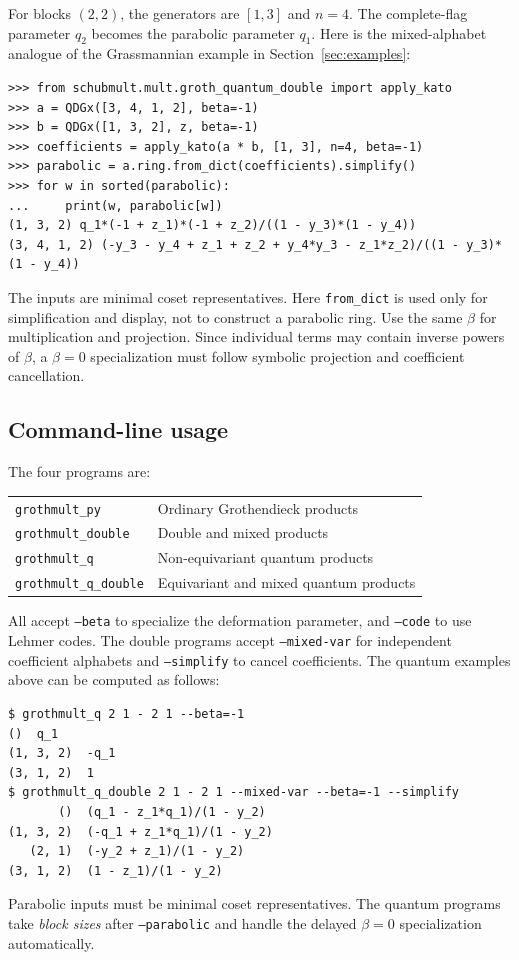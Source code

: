 \documentclass{amsart}
\theoremstyle{definition}
\theoremstyle{remark}
\numberwithin{equation}{section}
\begin{document}
For blocks $(2,2)$, the generators are $[1,3]$ and $n=4$.
The complete-flag parameter $q_2$ becomes the parabolic parameter $q_1$.
Here is the mixed-alphabet analogue of the Grassmannian example in
Section~\ref{sec:examples}:
\begin{verbatim}
>>> from schubmult.mult.groth_quantum_double import apply_kato
>>> a = QDGx([3, 4, 1, 2], beta=-1)
>>> b = QDGx([1, 3, 2], z, beta=-1)
>>> coefficients = apply_kato(a * b, [1, 3], n=4, beta=-1)
>>> parabolic = a.ring.from_dict(coefficients).simplify()
>>> for w in sorted(parabolic):
...     print(w, parabolic[w])
(1, 3, 2) q_1*(-1 + z_1)*(-1 + z_2)/((1 - y_3)*(1 - y_4))
(3, 4, 1, 2) (-y_3 - y_4 + z_1 + z_2 + y_4*y_3 - z_1*z_2)/((1 - y_3)*(1 - y_4))
\end{verbatim}
The inputs are minimal coset representatives. Here \texttt{from\_dict}
is used only for simplification and display, not to construct a
parabolic ring. Use the same $\beta$ for multiplication and projection.
Since individual terms may contain inverse powers of $\beta$,
a $\beta=0$ specialization must follow symbolic projection and
coefficient cancellation.

\subsection{Command-line usage}

The four programs are:
\begin{center}
\begin{tabular}{ll}
\texttt{grothmult\_py} & Ordinary Grothendieck products\\
\texttt{grothmult\_double} & Double and mixed products\\
\texttt{grothmult\_q} & Non-equivariant quantum products\\
\texttt{grothmult\_q\_double} & Equivariant and mixed quantum products
\end{tabular}
\end{center}
All accept \texttt{--beta} to specialize the deformation parameter,
and \texttt{--code} to use Lehmer codes.
The double programs accept \texttt{--mixed-var} for independent
coefficient alphabets and \texttt{--simplify} to cancel coefficients.
The quantum examples above can be computed as follows:
\begin{verbatim}
$ grothmult_q 2 1 - 2 1 --beta=-1
()  q_1
(1, 3, 2)  -q_1
(3, 1, 2)  1
$ grothmult_q_double 2 1 - 2 1 --mixed-var --beta=-1 --simplify
       ()  (q_1 - z_1*q_1)/(1 - y_2)
(1, 3, 2)  (-q_1 + z_1*q_1)/(1 - y_2)
   (2, 1)  (-y_2 + z_1)/(1 - y_2)
(3, 1, 2)  (1 - z_1)/(1 - y_2)
\end{verbatim}
Parabolic inputs must be minimal coset representatives.
The quantum programs take \emph{block sizes} after
\texttt{--parabolic} and handle the delayed $\beta=0$
specialization automatically.
\end{document}
